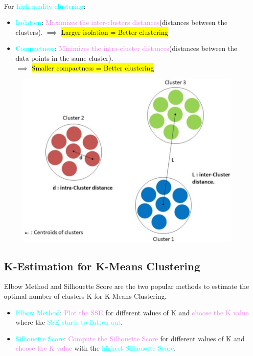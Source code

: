 \documentclass{book}
\begin{document}
\\
\vspace{2mm}
For \textcolor{cyan}{high quality clustering}:\\
\begin{itemize}
    \item \textcolor{cyan}{Isolation}: \textcolor{violet}{Maximizes the inter-clusters distances}(distances between the clusters). $\implies$ \hl{Larger isolation = Better clustering}
    \item \textcolor{cyan}{Compactness}: \textcolor{violet}{Minimizes the intra-cluster distances}(distances between the data points in the same cluster).\\
    $\implies$ \hl{Smaller compactness = Better clustering}
\end{itemize}
\begin{figure}[h]
    \centering
    \includegraphics[scale=0.2]{chapter 5/ch5_figure9.jpeg}
\end{figure}
\subsection{K-Estimation for K-Means Clustering}
Elbow Method and Silhouette Score are the two popular methods to estimate the optimal number of clusters K for K-Means Clustering.\\
\begin{itemize}
    \item \textcolor{cyan}{Elbow Method}: \textcolor{violet}{Plot the SSE} for different values of K and \textcolor{violet}{choose the K value} where the \textcolor{cyan}{SSE starts to flatten out}.
    \item \textcolor{cyan}{Silhouette Score}: \textcolor{violet}{Compute the Silhouette Score} for different values of K and \textcolor{violet}{choose the K value} with the \textcolor{cyan}{highest Silhouette Score}.
\end{itemize}
\end{document}
